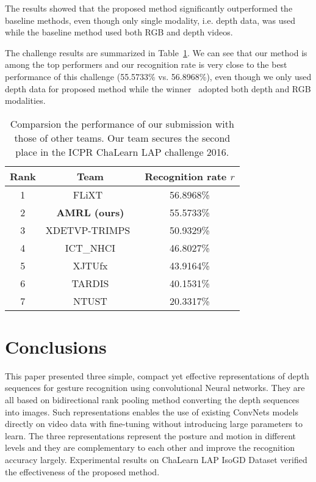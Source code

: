 \documentclass[10pt, a4paper, conference]{IEEEtran}
\begin{document}
The results showed that the proposed method
significantly outperformed the baseline methods, even though only single
modality, i.e. depth data, was used while the baseline method used both RGB and
depth videos.

The challenge results are summarized in Table~\ref{table3}. We can see that our method is among the top performers and our recognition rate is very close to the best performance of this challenge (55.5733\% vs. 56.8968\%), even though we only used depth data for proposed method while the winner~\cite{yunanli} adopted both depth and RGB modalities.

\begin{table}[!ht]
\centering
\caption{Comparsion the performance of our submission with those of other teams. Our team secures the second place in the ICPR ChaLearn LAP challenge 2016. \label{table3}}
\begin{tabular}{|c|c|c|}
\hline
Rank & Team & Recognition rate $r$\\
\hline
1 & FLiXT~\cite{yunanli} & 56.8968\%\\
\hline
2 & \textbf{AMRL (ours)} & 55.5733\%\\
\hline
3 & XDETVP-TRIMPS~\cite{guangming} & 50.9329\%\\
\hline
4 & ICT\_NHCI & 46.8027\%\\
\hline
5 & XJTUfx & 43.9164\%\\
\hline
6 & TARDIS & 40.1531\%\\
\hline
7 & NTUST & 20.3317\%\\
\hline
\end{tabular}
\end{table}

\section{Conclusions}

This paper presented three simple, compact yet effective representations of depth sequences for gesture recognition using convolutional Neural networks. They are all based on bidirectional rank pooling method converting the depth sequences into images. Such representations enables the use of existing ConvNets models directly on video data with fine-tuning without introducing large parameters to learn. The three representations represent the posture and motion in different levels and they are complementary to each other and improve the recognition accuracy largely. Experimental results on ChaLearn LAP IsoGD Dataset verified the effectiveness of the proposed method.
\end{document}
